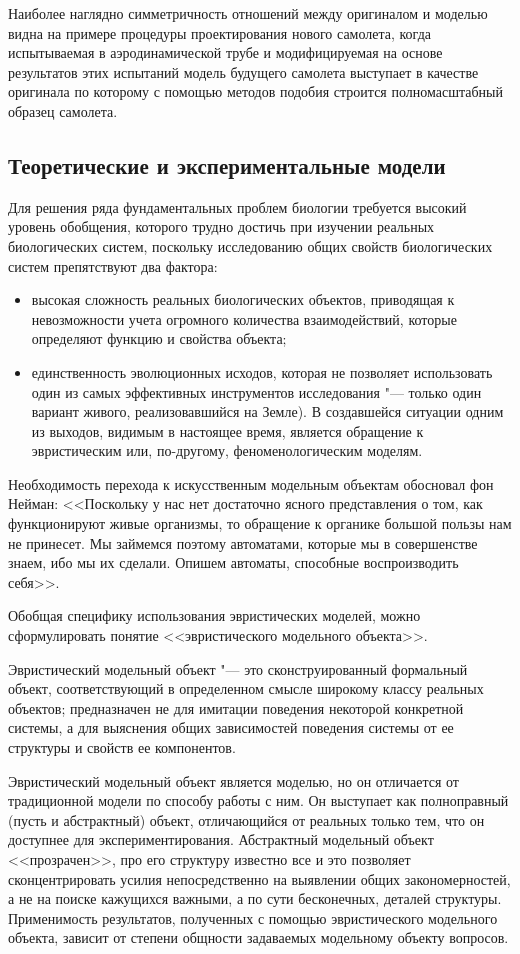 \documentclass[12pt,a4paper,oneside]{book}
\begin{document}
Наиболее наглядно симметричность отношений между оригиналом и моделью видна на примере процедуры проектирования нового самолета, когда испытываемая в аэродинамической трубе и модифицируемая на основе результатов этих испытаний модель будущего самолета выступает в качестве оригинала по которому с помощью методов подобия строится полномасштабный образец самолета.


\subsection{Теоретические и экспериментальные модели}

Для решения ряда фундаментальных проблем биологии требуется высокий уровень обобщения, которого трудно достичь при изучении реальных биологических систем, поскольку исследованию общих свойств биологических систем препятствуют два фактора:
\begin{itemize}
\item высокая сложность реальных биологических объектов, приводящая к невозможности учета огромного количества взаимодействий, которые определяют функцию и свойства объекта;
\item единственность эволюционных исходов, которая не позволяет использовать один из самых эффективных инструментов исследования "--- только один вариант живого, реализовавшийся на Земле).
В создавшейся ситуации одним из выходов, видимым в настоящее время, является обращение к эвристическим или, по-другому, феноменологическим моделям.
\end{itemize}

Необходимость перехода к искусственным модельным объектам обосновал фон Нейман: <<Поскольку у нас нет достаточно ясного представления о том, как функционируют живые организмы, то обращение к органике большой пользы нам не принесет. Мы займемся поэтому автоматами, которые мы в совершенстве знаем, ибо мы их сделали. Опишем автоматы, способные воспроизводить себя>>.

Обобщая специфику использования эвристических моделей, можно сформулировать понятие <<эвристического модельного объекта>>.

Эвристический модельный объект "--- это сконструированный формальный объект, соответствующий в определенном смысле широкому классу реальных объектов; предназначен не для имитации поведения некоторой конкретной системы, а для выяснения общих зависимостей поведения системы от ее структуры и свойств ее компонентов.

Эвристический модельный объект является моделью, но он отличается от традиционной модели по способу работы с ним. Он выступает как полноправный (пусть и абстрактный) объект, отличающийся от реальных только тем, что он доступнее для экспериментирования. Абстрактный модельный объект <<прозрачен>>, про его структуру известно все и это позволяет сконцентрировать усилия непосредственно на выявлении общих закономерностей, а не на поиске кажущихся важными, а по сути бесконечных, деталей структуры. Применимость результатов, полученных с помощью эвристического модельного объекта, зависит от степени общности задаваемых модельному объекту вопросов.
\end{document}
